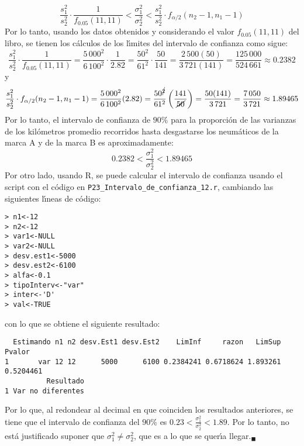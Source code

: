 \begin{solucion}
\begin{equation*}
  \frac{s_1^2}{s_2^2}\cdot\frac{1}{f_{0.05}(11,11)} < \frac{\sigma_1^2}{\sigma_2^2} < \frac{s_1^2}{s_2^2}\cdot f_{\alpha/2}(n_2-1,n_1-1)
 \end{equation*}
 Por lo tanto, usando los datos obtenidos y considerando el valor $f_{0.05}(11,11)$ del libro, se tienen los c\'alculos de los l\'{\i}mites del intervalo de confianza como sigue:
 \begin{equation*}
  \frac{s_1^2}{s_2^2}\cdot\frac{1}{f_{0.05}(11,11)} = \frac{5\,000^2}{6\,100^2} \cdot \frac{1}{2.82} = \frac{50^2}{61^2} \cdot \frac{50}{141} = \frac{2\,500(50)}{3\,721(141)} = \frac{125\,000}{524\,661} \approx 0.2382
 \end{equation*}
 y
 \begin{equation*}
  \frac{s_1^2}{s_2^2}\cdot f_{\alpha/2}(n_2-1,n_1-1) = \frac{5\,000^2}{6\,100^2} (2.82) = \frac{50^{\cancel{2}}}{61^2}\left( \frac{141}{\cancel{50}} \right) = \frac{50(141)}{3\,721} = \frac{7\,050}{3\,721} \approx 1.89465
 \end{equation*}
 Por lo tanto, el intervalo de confianza de $90\%$ para la proporci\'on de las varianzas de los kil\'ometros promedio recorridos hasta desgastarse los neum\'aticos de la marca A y de la marca B es aproximadamente:
 \begin{equation*}
  0.2382 < \frac{\sigma_1^2}{\sigma_2^2} < 1.89465
 \end{equation*}
 Por otro lado, usando R, se puede calcular el intervalo de confianza usando el script con el c\'odigo en \texttt{P23\_Intervalo\_de\_confianza\_12.r}, cambiando las siguientes l\'{\i}neas de c\'odigo:
 \begin{verbatim}
> n1<-12
> n2<-12
> var1<-NULL
> var2<-NULL
> desv.est1<-5000
> desv.est2<-6100
> alfa<-0.1
> tipoInterv<-"var"
> inter<-'D'
> val<-TRUE
 \end{verbatim}
 \vspace{-0.5cm}
 con lo que se obtiene el siguiente resultado:
 \begin{verbatim}
  Estimando n1 n2 desv.Est1 desv.Est2    LimInf     razon   LimSup    Pvalor
1       var 12 12      5000      6100 0.2384241 0.6718624 1.893261 0.5204461
          Resultado
1 Var no diferentes
 \end{verbatim}
 \vspace{-0.5cm}
 Por lo que, al redondear al decimal en que coinciden los resultados anteriores, se tiene que el intervalo de confianza del $90\%$ es $0.23 < \frac{\sigma_1^2}{\sigma_2^2} < 1.89$. Por lo tanto, no est\'a justificado suponer que $\sigma_1^2 \neq \sigma_2^2$, que es a lo que se quer\'{\i}a llegar.${}_{\blacksquare}$
\end{solucion}
